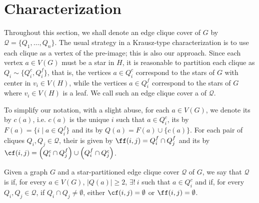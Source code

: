 \section{Characterization}

Throughout this section, we shall denote an edge clique cover of $G$ by $\mathcal{Q} = \{Q_1, \dots, Q_n\}$.
The usual strategy in a Krausz-type characterization is to use each clique as a vertex of the pre-image; this is also our approach.
Since each vertex $a \in V(G)$ must be a star in $H$, it is reasonable to partition each clique as $Q_i \sim \{Q_i^c, Q_i^f\}$, that is, the vertices $a \in Q_i^c$ correspond to the stars of $G$ with center in $v_i \in V(H)$, while the vertices $a \in Q_i^f$ correspond to the stars of $G$ where $v_i \in V(H)$ is a leaf.
We call such an edge clique cover a  of $\mathcal{Q}$.

To simplify our notation, with a slight abuse, for each $a \in V(G)$, we denote its  by $c(a)$, i.e. $c(a)$ is the unique $i$ such that $a \in Q_i^c$, its  by $F(a) = \{i \mid a \in Q_i^f\}$ and its  by $Q(a) = F(a) \cup \{c(a)\}$. For each pair of cliques $Q_i, Q_j \in \mathcal{Q}$, their  is given by $\ff(i,j) = Q_i^f \cap Q_j^f$ and its  by $\cf(i,j) = \left(Q_i^c \cap Q_j^f\right) \cup \left(Q_i^f \cap Q_j^c\right)$.

\begin{definition}
    Given a graph $G$ and a star-partitioned edge clique cover $\mathcal{Q}$ of $G$, we say that $\mathcal{Q}$ is  if, for every $a \in V(G)$, $|Q(a)| \geq 2$, $\exists!\ i$ such that $a \in Q_i^c$ and if, for every $Q_i, Q_j \in \mathcal{Q}$, if $Q_i \cap Q_j \neq \emptyset$, either $\cf(i,j) = \emptyset$ or $\ff(i,j) = \emptyset$.
\end{definition}

